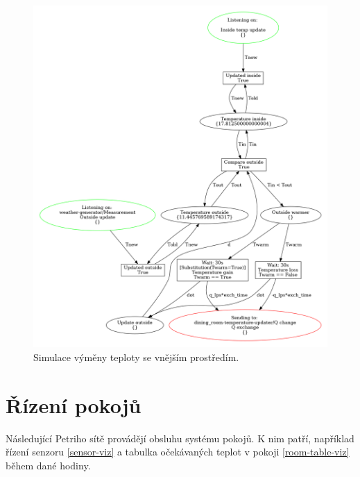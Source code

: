 \begin{figure}[htb]
 \centering
 \includegraphics[width=\textwidth]{obrazky-figures/room-exchange.png}
 \caption{Simulace výměny teploty se vnějším prostředím.}
 \label{exchange-viz}
\end{figure}


\section{Řízení pokojů}
\label{sec:server-details}

Následující Petriho sítě provádějí obsluhu systému pokojů. K nim patří, například řízení senzoru \ref{sensor-viz} a tabulka očekávaných teplot v pokoji \ref{room-table-viz} během dané hodiny.

